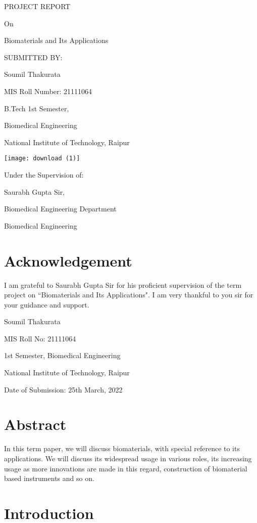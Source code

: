 \documentclass[11pt]{article}
\begin{document}
{\centering PROJECT REPORT


On


Biomaterials and Its Applications


SUBMITTED BY:


Soumil Thakurata


MIS Roll Number: 21111064


B.Tech 1st Semester,


Biomedical Engineering 

National Institute of Technology, Raipur


\texttt{[image: download (1)]}

Under the Supervision of:

Saurabh Gupta Sir,

Biomedical Engineering Department

Biomedical Engineering \par}

\pagebreak

\section*{\centering Acknowledgement}

I am grateful to Saurabh Gupta Sir for his proficient supervision of the term project on “Biomaterials and Its Applications". I am very thankful to you sir for your guidance and support.
\\
\begin{flushright}
Soumil Thakurata

MIS Roll No: 21111064

1st Semester, Biomedical Engineering

National Institute of Technology, Raipur
\end{flushright}

Date of Submission: 25th March, 2022

\pagebreak
\section*{\centering Abstract}
In this term paper, we will discuss biomaterials, with special reference to its applications. We will discuss its widespread usage in various roles, its increasing usage as more innovations are made in this regard, construction of biomaterial based instruments and so on.
\pagebreak

\section*{Introduction}
\end{document}
